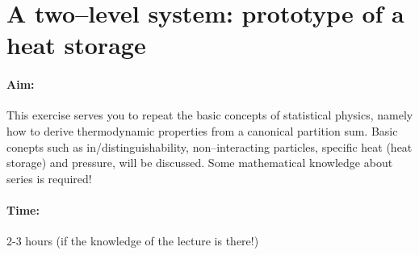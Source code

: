 \documentclass[12pt,a4paper]{article} %
\begin{document}
 
 
 \vspace{1cm}
 
 \section{A two--level system: prototype of a heat storage}
 \paragraph{Aim:} This exercise serves you to repeat the basic concepts of statistical physics, namely how to derive thermodynamic properties from a canonical partition sum. Basic conepts such as in/distinguishability, non--interacting particles, specific heat (heat storage) and pressure, will be discussed. Some mathematical knowledge about series is required!
 \paragraph{Time:} 2-3 hours (if the knowledge of the lecture is there!)\\
 
\end{document}
